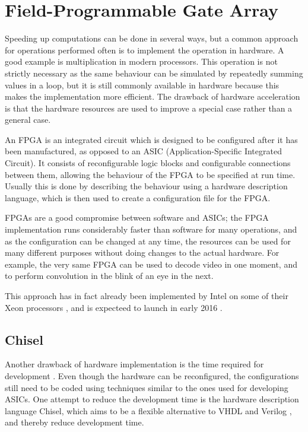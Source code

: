 \section{Field-Programmable Gate Array}
Speeding up computations can be done in several ways, but a common approach for operations performed often is to implement the operation in hardware.
A good example is multiplication in modern processors.
This operation is not strictly necessary as the same behaviour can be simulated by repeatedly summing values in a loop, but it is still commonly available in hardware because this makes the implementation more efficient.
The drawback of hardware acceleration is that the hardware resources are used to improve a special case rather than a general case.

An FPGA is an integrated circuit which is designed to be configured after it has been manufactured, as opposed to an ASIC (Application-Specific Integrated Circuit).
It consists of reconfigurable logic blocks and configurable connections between them, allowing the behaviour of the FPGA to be specified at run time. Usually this is done by describing the behaviour using a hardware description language, which is then used to create a configuration file for the FPGA.

FPGAs are a good compromise between software and ASICs; the FPGA implementation runs considerably faster than software for many operations, and as the configuration can be changed at any time, the resources can be used for many different purposes without doing changes to the actual hardware.
For example, the very same FPGA can be used to decode video in one moment, and to perform convolution in the blink of an eye in the next.

This approach has in fact already been implemented by Intel on some of their Xeon processors \cite{intelxeonfpga}, and is expecteed to launch in early 2016 \cite{PCWorldIntelFPGA}.

\subsection{Chisel}
\label{sec:chisel}
Another drawback of hardware implementation is the time required for development \cite{fpgaprosandcons}. 
Even though the hardware can be reconfigured, the configurations still need to be coded using techniques similar to the ones used for developing ASICs.
One attempt to reduce the development time is the hardware description language Chisel, which aims to be a flexible alternative to VHDL and Verilog \cite{chiselpaper}, and thereby reduce development time.
